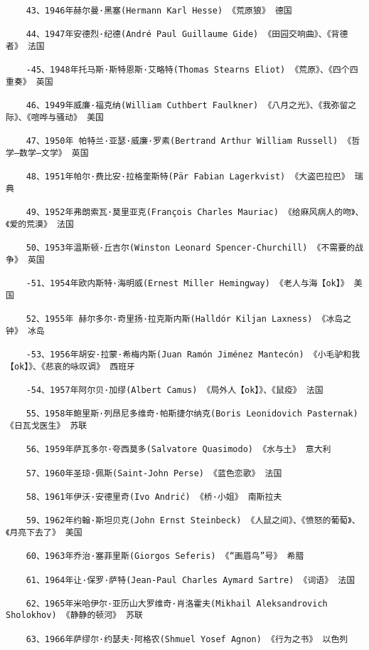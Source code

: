 \documentclass[UTF8]{../RepresentationUniverse}
\begin{document}
\begin{lstlisting}
    43、1946年赫尔曼·黑塞(Hermann Karl Hesse) 《荒原狼》 德国
    
    44、1947年安德烈·纪德(André Paul Guillaume Gide) 《田园交响曲》、《背德者》 法国
    
    -45、1948年托马斯·斯特恩斯·艾略特(Thomas Stearns Eliot) 《荒原》、《四个四重奏》 英国
    
    46、1949年威廉·福克纳(William Cuthbert Faulkner) 《八月之光》、《我弥留之际》、《喧哗与骚动》 美国
    
    47、1950年 帕特兰·亚瑟·威廉·罗素(Bertrand Arthur William Russell) 《哲学—数学—文学》 英国
    
    48、1951年帕尔·费比安·拉格奎斯特(Pär Fabian Lagerkvist) 《大盗巴拉巴》 瑞典
    
    49、1952年弗朗索瓦·莫里亚克(François Charles Mauriac) 《给麻风病人的吻》、《爱的荒漠》 法国
    
    50、1953年温斯顿·丘吉尔(Winston Leonard Spencer-Churchill) 《不需要的战争》 英国
    
    -51、1954年欧内斯特·海明威(Ernest Miller Hemingway) 《老人与海【ok】》 美国
    
    52、1955年 赫尔多尔·奇里扬·拉克斯内斯(Halldór Kiljan Laxness) 《冰岛之钟》 冰岛
    
    -53、1956年胡安·拉蒙·希梅内斯(Juan Ramón Jiménez Mantecón) 《小毛驴和我【ok】》、《悲哀的咏叹调》 西班牙
    
    -54、1957年阿尔贝·加缪(Albert Camus) 《局外人【ok】》、《鼠疫》 法国
    
    55、1958年鲍里斯·列昂尼多维奇·帕斯捷尔纳克(Boris Leonidovich Pasternak) 《日瓦戈医生》 苏联
    
    56、1959年萨瓦多尔·夸西莫多(Salvatore Quasimodo) 《水与土》 意大利
    
    57、1960年圣琼·佩斯(Saint-John Perse) 《蓝色恋歌》 法国
    
    58、1961年伊沃·安德里奇(Ivo Andrić) 《桥·小姐》 南斯拉夫
    
    59、1962年约翰·斯坦贝克(John Ernst Steinbeck) 《人鼠之间》、《愤怒的葡萄》、《月亮下去了》 美国
    
    60、1963年乔治·塞菲里斯(Giorgos Seferis) 《“画眉鸟”号》 希腊
    
    61、1964年让·保罗·萨特(Jean-Paul Charles Aymard Sartre) 《词语》 法国
    
    62、1965年米哈伊尔·亚历山大罗维奇·肖洛霍夫(Mikhail Aleksandrovich Sholokhov) 《静静的顿河》 苏联
    
    63、1966年萨缪尔·约瑟夫·阿格农(Shmuel Yosef Agnon) 《行为之书》 以色列
    

\end{lstlisting}
\end{document}
